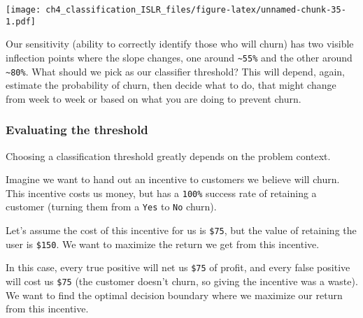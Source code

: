 \documentclass[
]{article}
\begin{document}
\texttt{[image: ch4\_classification\_ISLR\_files/figure-latex/unnamed-chunk-35-1.pdf]}

Our sensitivity (ability to correctly identify those who will churn) has
two visible inflection points where the slope changes, one around
\texttt{\textasciitilde{}55\%} and the other around
\texttt{\textasciitilde{}80\%}. What should we pick as our classifier
threshold? This will depend, again, estimate the probability of churn,
then decide what to do, that might change from week to week or based on
what you are doing to prevent churn.

\hypertarget{evaluating-the-threshold}{%
\subsubsection{Evaluating the
threshold}\label{evaluating-the-threshold}}

Choosing a classification threshold greatly depends on the problem
context.

Imagine we want to hand out an incentive to customers we believe will
churn. This incentive costs us money, but has a \texttt{100\%} success
rate of retaining a customer (turning them from a \texttt{Yes} to
\texttt{No} churn).

Let's assume the cost of this incentive for us is \texttt{\$75}, but the
value of retaining the user is \texttt{\$150}. We want to maximize the
return we get from this incentive.

In this case, every true positive will net us \texttt{\$75} of profit,
and every false positive will cost us \texttt{\$75} (the customer
doesn't churn, so giving the incentive was a waste). We want to find the
optimal decision boundary where we maximize our return from this
incentive.
\end{document}
